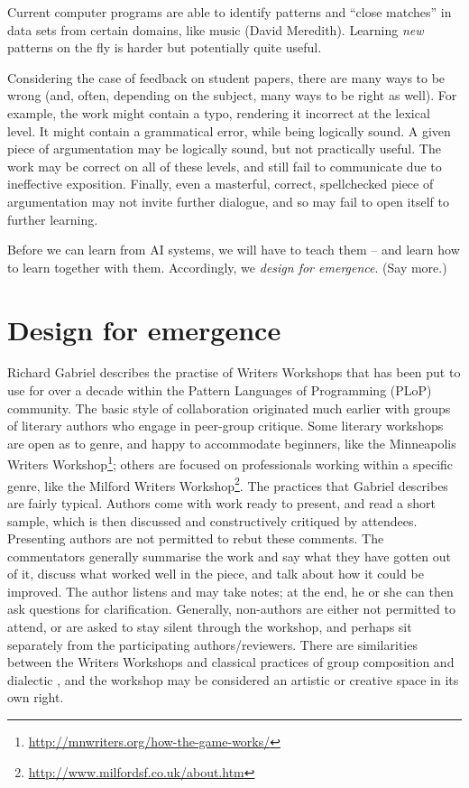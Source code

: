 \documentclass[letter]{article}
\begin{document}
Current computer programs are able to identify patterns and ``close matches'' in data sets from certain domains, like music (David Meredith).  Learning \emph{new} patterns on the fly is harder but potentially quite useful.

Considering the case of feedback on student papers, there are many ways to be wrong (and, often, depending on the subject, many ways to be right as well).  For example, the work might contain a typo, rendering it incorrect at the lexical level.  It might contain a grammatical error, while being logically sound.  A given piece of argumentation may be logically sound, but not practically useful.   The work may be correct on all of these levels, and still fail to communicate due to ineffective exposition.  Finally, even a masterful, correct, spellchecked piece of argumentation may not invite further dialogue, and so may fail to open itself to further learning.

Before we can learn from AI systems, we will have to teach them -- and learn how to learn together with them.  Accordingly, we \emph{design for emergence}.  (Say more.)

\section{Design for emergence} \label{sec:writers-workshop}

Richard Gabriel \citeyear{gabriel2002writer} describes the practise of
Writers Workshops that has been put to use for over a decade within
the Pattern Languages of Programming (PLoP) community.  The basic
style of collaboration originated much earlier with groups of literary
authors who engage in peer-group critique.  Some literary workshops
are open as to genre, and happy to accommodate beginners, like the
Minneapolis Writers
Workshop\footnote{\url{http://mnwriters.org/how-the-game-works/}};
others are focused on professionals working within a specific genre,
like the Milford Writers
Workshop\footnote{\url{http://www.milfordsf.co.uk/about.htm}}.  The
practices that Gabriel describes are fairly typical.  Authors come
with work ready to present, and read a short sample, which is then
discussed and constructively critiqued by attendees.  Presenting
authors are not permitted to rebut these comments.  The commentators
generally summarise the work and say what they have gotten out of it,
discuss what worked well in the piece, and talk about how it could be
improved.  The author listens and may take notes; at the end, he or
she can then ask questions for clarification.  Generally, non-authors
are either not permitted to attend, or are asked to stay silent
through the workshop, and perhaps sit separately from the
participating authors/reviewers.  There are similarities between the
Writers Workshops and classical practices of group composition
\cite{jin1975art} and dialectic \cite{dialectique}, and the workshop
may be considered an artistic or creative space in its own right.
\end{document}
